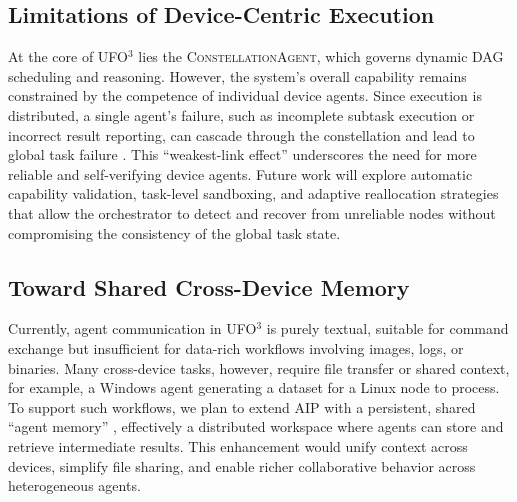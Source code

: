 \documentclass[10pt]{article} %
\newcommand{\ufo}{\textsc{UFO}$^3$\xspace}
\newcommand{\cagent}{\textsc{ConstellationAgent}\xspace}
\begin{document}
\subsection{Limitations of Device-Centric Execution}
At the core of \ufo lies the \cagent, which governs dynamic DAG scheduling and reasoning. However, the system's overall capability remains constrained by the competence of individual device agents. Since execution is distributed, a single agent's failure, such as incomplete subtask execution or incorrect result reporting, can cascade through the constellation and lead to global task failure \cite{cemri2025multi}. This ``weakest-link effect'' underscores the need for more reliable and self-verifying device agents. Future work will explore automatic capability validation, task-level sandboxing, and adaptive reallocation strategies that allow the orchestrator to detect and recover from unreliable nodes without compromising the consistency of the global task state.

\subsection{Toward Shared Cross-Device Memory}
Currently, agent communication in \ufo is purely textual, suitable for command exchange but insufficient for data-rich workflows involving images, logs, or binaries. Many cross-device tasks, however, require file transfer or shared context, for example, a Windows agent generating a dataset for a Linux node to process. To support such workflows, we plan to extend AIP with a persistent, shared ``agent memory'' \cite{zhang2025survey}, effectively a distributed workspace where agents can store and retrieve intermediate results. This enhancement would unify context across devices, simplify file sharing, and enable richer collaborative behavior across heterogeneous agents.

\end{document}
